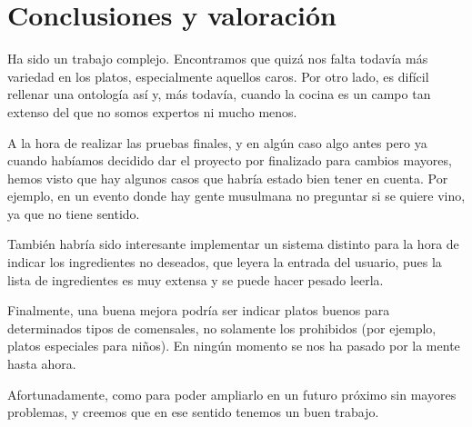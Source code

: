 % 

\section{Conclusiones y valoración}
Ha sido un trabajo complejo. Encontramos que quizá nos falta todavía más
variedad en los platos, especialmente aquellos caros. Por otro lado, es difícil
rellenar una ontología así y, más todavía, cuando la cocina es un campo tan
extenso del que no somos expertos ni mucho menos.

A la hora de realizar las pruebas finales, y en algún caso algo antes pero ya
cuando habíamos decidido dar el proyecto por finalizado para cambios mayores,
hemos visto que hay algunos casos que habría estado bien tener en cuenta. Por
ejemplo, en un evento donde hay gente musulmana no preguntar si se quiere vino,
ya que no tiene sentido.

También habría sido interesante implementar un sistema distinto para la hora de
indicar los ingredientes no deseados, que leyera la entrada del usuario, pues
la lista de ingredientes es muy extensa y se puede hacer pesado leerla.

Finalmente, una buena mejora podría ser indicar platos buenos para determinados
tipos de comensales, no solamente los prohibidos (por ejemplo, platos
especiales para niños). En ningún momento se nos ha pasado por la mente hasta
ahora.

Afortunadamente,  como para
poder ampliarlo en un futuro próximo sin mayores problemas, y creemos que en
ese sentido tenemos un buen trabajo.
